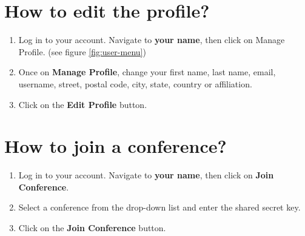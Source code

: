 \documentclass[nochapterpage,nopartpage,noheadingspace,numbersubsubsec,bigchapter,colorback,accentcolor=tud9c,10pt]{tudreport}
\begin{document}

	\section{How to edit the profile?}


\begin{enumerate}
	\item	Log in to your account. Navigate to \textbf{your name}, then click on {Manage Profile}. (see figure \ref{fig:user-menu})
	\item	Once on \textbf{Manage Profile}, change your first name, last name, email, username, street, postal code, city, state, country or affiliation.
	\item	Click on the \textbf{Edit Profile} button.
\end{enumerate}



	\section{How to join a conference?}


\begin{enumerate}
	\item	Log in to your account. Navigate to \textbf{your name}, then click on \textbf{Join Conference}.
	\item	Select a conference from the drop-down list and enter the shared secret key.
	\item	Click on the \textbf{Join Conference} button.
\end{enumerate}
\end{document}

